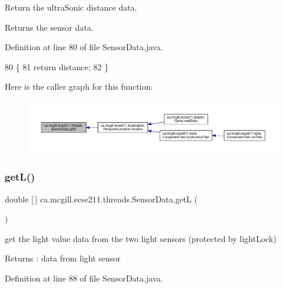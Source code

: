 Return the ultra\+Sonic distance data.

\begin{DoxyReturn}{Returns}
the sensor data. 
\end{DoxyReturn}


Definition at line 80 of file Sensor\+Data.\+java.


\begin{DoxyCode}
80                        \{
81     \textcolor{keywordflow}{return} distance;
82   \}
\end{DoxyCode}
Here is the caller graph for this function\+:\nopagebreak
\begin{figure}[H]
\begin{center}
\leavevmode
\includegraphics[width=350pt]{classca_1_1mcgill_1_1ecse211_1_1threads_1_1_sensor_data_a46cc30522719018a80f89624e0ce458f_icgraph}
\end{center}
\end{figure}
\mbox{\label{classca_1_1mcgill_1_1ecse211_1_1threads_1_1_sensor_data_a39eec50582f0e4bcff8a4669c48e1609}} 
\subsubsection{\texorpdfstring{get\+L()}{getL()}}
{\footnotesize\ttfamily double \mbox{[}$\,$\mbox{]} ca.\+mcgill.\+ecse211.\+threads.\+Sensor\+Data.\+getL (\begin{DoxyParamCaption}{ }\end{DoxyParamCaption})}

get the light value data from the two light sensors (protected by light\+Lock) \begin{DoxyReturn}{Returns}
\+: data from light sensor 
\end{DoxyReturn}


Definition at line 88 of file Sensor\+Data.\+java.


